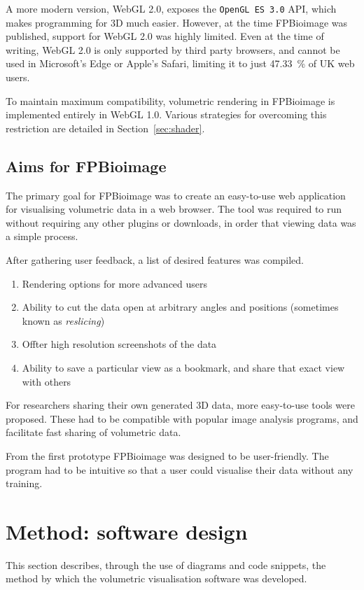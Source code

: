 A more modern version, WebGL 2.0, exposes the \texttt{OpenGL ES 3.0} API, which makes programming for 3D much easier.
However, at the time FPBioimage was published, support for WebGL 2.0 was highly limited. 
Even at the time of writing, WebGL 2.0 is only supported by third party browsers, and cannot be used in Microsoft's Edge or Apple's Safari, limiting it to just \SI{47.33}{\percent} of UK web users.

To maintain maximum compatibility, volumetric rendering in FPBioimage is implemented entirely in WebGL 1.0.
Various strategies for overcoming this restriction are detailed in Section~\ref{sec:shader}.

\subsection{Aims for FPBioimage} 
The primary goal for FPBioimage was to create an easy-to-use web application for visualising volumetric data in a web browser. 
The tool was required to run without requiring any other plugins or downloads, in order that viewing data was a simple process. 

After gathering user feedback, a list of desired features was compiled. 

\begin{enumerate}
	\item Rendering options for more advanced users
	\item Ability to cut the data open at arbitrary angles and positions (sometimes known as \textit{reslicing})
	\item Offter high resolution screenshots of the data
	\item Ability to save a particular view as a bookmark, and share that exact view with others
\end{enumerate}

For researchers sharing their own generated 3D data, more easy-to-use tools were proposed. 
These had to be compatible with popular image analysis programs, and facilitate fast sharing of volumetric data. 

From the first prototype FPBioimage was designed to be user-friendly. 
The program had to be intuitive so that a user could visualise their data without any training. 

\section{Method: software design} \label{sec:fpbSoftwareDesign}
This section describes, through the use of diagrams and code snippets, the method by which the volumetric visualisation software was developed.

